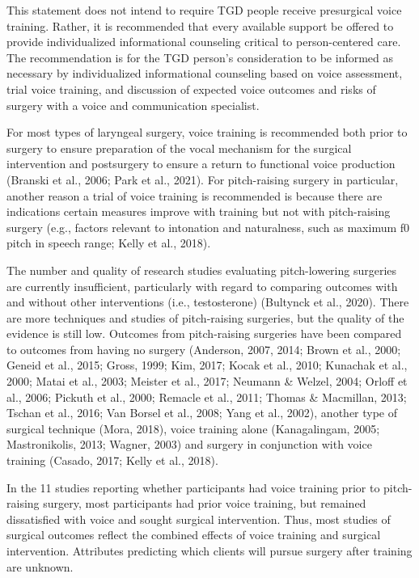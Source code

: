 \documentclass[
]{book}
\begin{document}
This statement does not intend to require TGD
people receive presurgical voice training. Rather,
it is recommended that every available support
be offered to provide individualized informational
counseling critical to person-centered care. The
recommendation is for the TGD person's consideration to be informed as necessary by individualized informational counseling based on voice
assessment, trial voice training, and discussion
of expected voice outcomes and risks of surgery
with a voice and communication specialist.

For most types of laryngeal surgery, voice
training is recommended both prior to surgery
to ensure preparation of the vocal mechanism
for the surgical intervention and postsurgery to
ensure a return to functional voice production
(Branski et al., 2006; Park et al., 2021). For
pitch-raising surgery in particular, another reason
a trial of voice training is recommended is
because there are indications certain measures
improve with training but not with pitch-raising
surgery (e.g., factors relevant to intonation and
naturalness, such as maximum f0 pitch in speech
range; Kelly et al., 2018).

The number and quality of research studies
evaluating pitch-lowering surgeries are currently
insufficient, particularly with regard to comparing
outcomes with and without other interventions
(i.e., testosterone) (Bultynck et al., 2020). There
are more techniques and studies of pitch-raising
surgeries, but the quality of the evidence is still
low. Outcomes from pitch-raising surgeries have
been compared to outcomes from having no surgery (Anderson, 2007, 2014; Brown et al., 2000;
Geneid et al., 2015; Gross, 1999; Kim, 2017;
Kocak et al., 2010; Kunachak et al., 2000; Matai
et al., 2003; Meister et al., 2017; Neumann \&
Welzel, 2004; Orloff et al., 2006; Pickuth et al.,
2000; Remacle et al., 2011; Thomas \& Macmillan,
2013; Tschan et al., 2016; Van Borsel et al., 2008;
Yang et al., 2002), another type of surgical technique (Mora, 2018), voice training alone
(Kanagalingam, 2005; Mastronikolis, 2013;
Wagner, 2003) and surgery in conjunction with
voice training (Casado, 2017; Kelly et al., 2018).

In the 11 studies reporting whether participants had voice training prior to pitch-raising
surgery, most participants had prior voice training, but remained dissatisfied with voice and
sought surgical intervention. Thus, most studies
of surgical outcomes reflect the combined effects
of voice training and surgical intervention.
Attributes predicting which clients will pursue
surgery after training are unknown.
\end{document}
